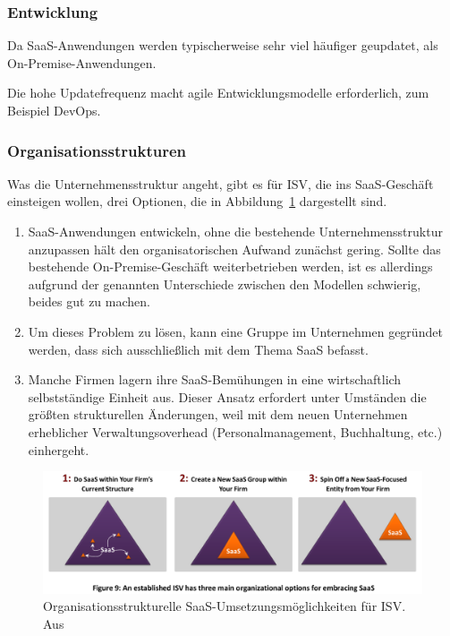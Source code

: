 \subsubsection{Entwicklung}
Da SaaS-Anwendungen werden typischerweise sehr viel häufiger geupdatet, als 
On-Premise-Anwendungen. 

Die hohe Updatefrequenz macht agile Entwicklungsmodelle erforderlich, zum 
Beispiel DevOps. 

\subsubsection{Organisationsstrukturen}
Was die Unternehmensstruktur angeht, gibt es für ISV, die ins SaaS-Geschäft 
einsteigen wollen, drei Optionen, die in 
Abbildung~\ref{fig:organisationsstrukturen} dargestellt sind. 
\begin{enumerate}
	\item SaaS-Anwendungen entwickeln, ohne die bestehende 
Unternehmensstruktur anzupassen hält den organisatorischen Aufwand zunächst 
gering. Sollte das bestehende On-Premise-Geschäft weiterbetrieben werden, ist 
es allerdings aufgrund der genannten Unterschiede zwischen den Modellen 
schwierig, beides gut zu machen.
	\item Um dieses Problem zu lösen, kann eine Gruppe im Unternehmen 
gegründet werden, dass sich ausschließlich mit dem Thema SaaS befasst. 
	\item Manche Firmen lagern ihre SaaS-Bemühungen in eine wirtschaftlich 
selbstständige Einheit aus. Dieser Ansatz erfordert unter Umständen die größten 
strukturellen Änderungen, weil mit dem neuen Unternehmen erheblicher 
Verwaltungsoverhead (Personalmanagement, Buchhaltung, etc.) einhergeht.
\end{enumerate}

\begin{figure}%
\begin{center}
\includegraphics[width=\textwidth]{images/organisationsstrukturen.png}
\caption{Organisationsstrukturelle SaaS-Umsetzungsmöglichkeiten für ISV. Aus 
\protect{} }
\label{fig:organisationsstrukturen}
\end{center}
\end{figure}

